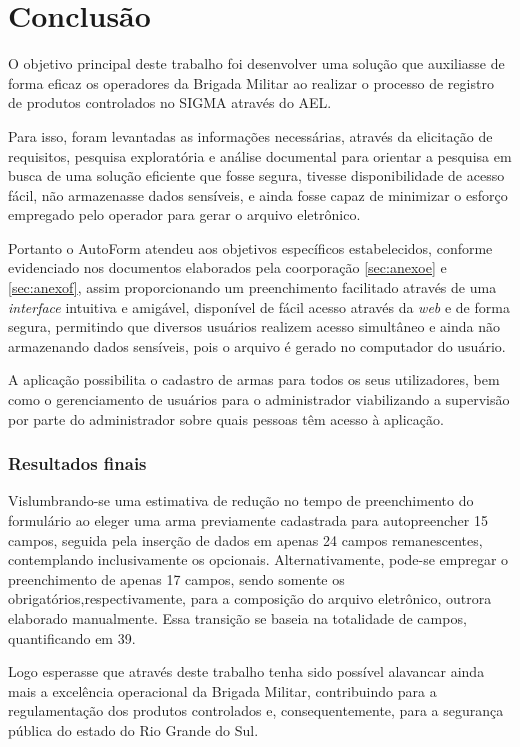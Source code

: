 \chapter{Conclusão}
O objetivo principal deste trabalho foi desenvolver uma solução que auxiliasse de forma eficaz os operadores da Brigada Militar ao realizar o processo de registro de produtos controlados no SIGMA através do AEL.

Para isso, foram levantadas as informações necessárias, através da elicitação de requisitos, pesquisa exploratória e análise documental para orientar a pesquisa em busca de uma solução eficiente que fosse segura, tivesse disponibilidade de acesso fácil, não armazenasse dados sensíveis, e ainda fosse capaz de minimizar o esforço empregado pelo operador para gerar o arquivo eletrônico.

Portanto o AutoForm atendeu aos objetivos específicos estabelecidos, conforme evidenciado nos documentos elaborados pela coorporação \ref{sec:anexoe} e \ref{sec:anexof}, assim proporcionando um preenchimento facilitado através de uma \textit{interface} intuitiva e amigável, disponível de fácil acesso através da \textit{web} e de forma segura, permitindo que diversos usuários realizem acesso simultâneo e ainda não armazenando dados sensíveis, pois o arquivo é gerado no computador do usuário.

A aplicação possibilita o cadastro de armas para todos os seus utilizadores, bem como o gerenciamento de usuários para o administrador viabilizando a supervisão por parte do administrador sobre quais pessoas têm acesso à aplicação.

\subsection{Resultados finais}

Vislumbrando-se uma estimativa de redução no tempo de preenchimento do formulário ao eleger uma arma previamente cadastrada para autopreencher 15 campos, seguida pela inserção de dados em apenas 24 campos remanescentes, contemplando inclusivamente os opcionais. 
Alternativamente, pode-se empregar o preenchimento de apenas 17 campos, sendo somente os obrigatórios,respectivamente, para a composição do arquivo eletrônico, outrora elaborado manualmente. Essa transição se baseia na totalidade de campos, quantificando em 39.


Logo esperasse que através deste trabalho tenha sido possível alavancar ainda mais a excelência operacional da Brigada Militar, contribuindo para a regulamentação dos produtos controlados e, consequentemente, para a segurança pública do estado do Rio Grande do Sul.

